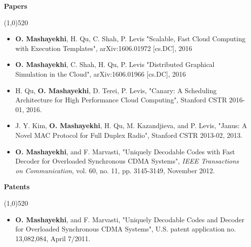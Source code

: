 \documentclass[letterpaper,10pt]{article}
\newcommand{\heading}[1] {
  {\large
    \begin{minipage}
    {\textwidth}
    {\textbf{#1}}
    \end{minipage}
  }
  \begin{center}
  \vspace{-15pt}
  \line(1,0){520}
  \end{center}
}
\begin{document}
\vspace{5pt}





\heading{Papers}

\begin{itemize}[noitemsep,topsep=0pt, leftmargin=.5cm, rightmargin=.5cm]


\item[]
\textbf{O. Mashayekhi}, H. Qu, C. Shah, P. Levis
"Scalable, Fast Cloud Computing with Execution Templates",
arXiv:1606.01972 [cs.DC], 2016


\vspace{5pt}

\item[]
\textbf{O. Mashayekhi}, C. Shah, H. Qu, P. Levis
"Distributed Graphical Simulation in the Cloud",
arXiv:1606.01966 [cs.DC], 2016

\vspace{5pt}

\item[]
H. Qu, \textbf{O. Mashayekhi}, D. Terei, P. Levis,
"Canary: A Scheduling Architecture for High Performance Cloud Computing",
Stanford CSTR 2016-01, 2016.


\vspace{5pt}

\item[]
J. Y. Kim, \textbf{O. Mashayekhi}, H. Qu, M. Kazandjieva, and P. Levis,
"Janus: A Novel MAC Protocol for Full Duplex Radio",
Stanford CSTR 2013-02, 2013.

\vspace{5pt}

\item[]
\textbf{O. Mashayekhi}, and F. Marvasti,
"Uniquely Decodable Codes with Fast Decoder for Overloaded Synchronous CDMA Systems",
\textit{IEEE Transactions on Communication}, vol. 60, no. 11, pp. 3145-3149, November 2012.

\end{itemize}

\vspace{5pt}





\heading{Patents}

\begin{itemize}[noitemsep,topsep=0pt, leftmargin=.5cm, rightmargin=.5cm]
\item[]
{\textbf{O. Mashayekhi}, and F. Marvasti, "Uniquely Decodable Codes and Decoder for Overloaded Synchronous CDMA Systems", U.S. patent application no. 13,082,084, April 7/2011.}
	\end{itemize}
\end{document}
